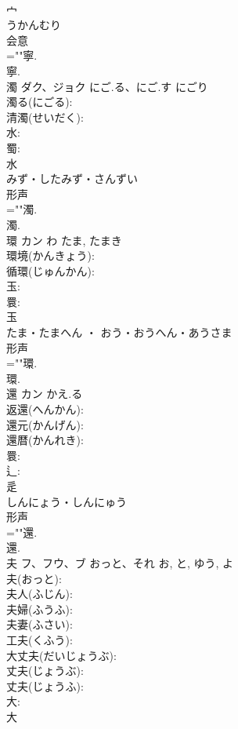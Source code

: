 \documentclass[8pt]{extreport}
\begin{document}
\begin{CJK}{UTF8}{min}
\\	宀	
\\	うかんむり	
\\	会意 
\\	=""寧.
\\	寧.
\\	濁	ダク、ジョク	にご.る、にご.す	にごり	
\\	濁る(にごる): 
\\	清濁(せいだく): 
\\	水: 
\\	蜀: 
\\	水	
\\	みず・したみず・さんずい	
\\	形声 
\\	=""濁.
\\	濁.
\\	環	カン	わ	たま, たまき	
\\	環境(かんきょう): 
\\	循環(じゅんかん): 
\\	玉: 
\\	睘: 
\\	玉	
\\	たま・たまへん ・ おう・おうへん・あうさま	
\\	形声 
\\	=""環.
\\	環.
\\	還	カン	かえ.る		
\\	返還(へんかん): 
\\	還元(かんげん): 
\\	還暦(かんれき): 
\\	睘: 
\\	辶: 
\\	辵	
\\	しんにょう・しんにゅう	
\\	形声 
\\	=""還.
\\	還.
\\	夫	フ、フウ、ブ	おっと、それ	お, と, ゆう, よ	
\\	夫(おっと): 
\\	夫人(ふじん): 
\\	夫婦(ふうふ): 
\\	夫妻(ふさい): 
\\	工夫(くふう): 
\\	大丈夫(だいじょうぶ): 
\\	丈夫(じょうぶ): 
\\	丈夫(じょうふ): 
\\	大: 
\\	大	

\end{CJK}
\end{document}

